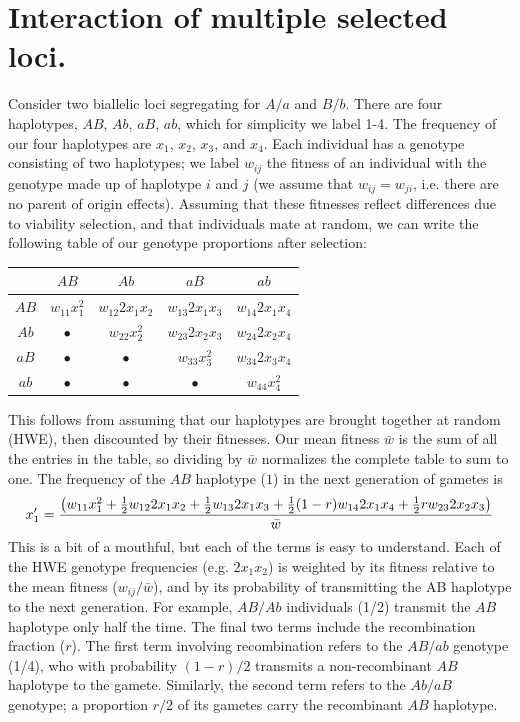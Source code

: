 \chapter{Interaction of multiple selected loci.}

Consider two biallelic loci segregating for $A/a$ and $B/b$. There are four haplotypes, $AB$, $Ab$, $aB$, $ab$, which for simplicity we label 1-4. The frequency of our four haplotypes are $x_1$, $x_2$, $x_3$, and $x_4$. Each individual has a genotype consisting of two haplotypes; we label $w_{ij}$ the fitness of an individual with the genotype made up of haplotype $i$ and $j$ (we assume that $w_{ij}=w_{ji}$, i.e. there are no parent of origin effects). Assuming that these fitnesses reflect differences due to viability selection, and that individuals mate at random, we can write the following table of our genotype proportions after selection:\\
\begin{center}
\begin{tabular}{c|cccc}
         & $AB$			& $Ab$				& $aB$				& $ab$\\
\hline
$AB$ & $w_{11} x_1^2$ 	& $w_{12} 2 x_1 x_2$  	& $w_{13} 2 x_1 x_3$ 	& $w_{14} 2 x_1 x_4$ \\
$Ab$ & $\bullet$ 	  	& $w_{22} x_2^2$ 	  	& $w_{23} 2 x_2 x_3$  	& $w_{24} 2 x_2 x_4$ \\  
$aB$ & $\bullet$ 		& $\bullet$ 			& $w_{33} x_3^2$ 	  	& $w_{34} 2 x_3 x_4$ \\  
$ab$ & $\bullet$ 		& $\bullet$			& $\bullet$ 			&  $w_{44} x_4^2$ \\
\end{tabular}
\end{center}
This follows from assuming that our haplotypes are brought together at random (HWE), then discounted by their fitnesses. Our mean fitness $\bar{w}$ is the sum of all the entries in the table, so dividing by $\bar{w}$ normalizes the complete table to sum to one. The frequency of the $AB$ haplotype ($1$) in the next generation of gametes is
\begin{equation}
x_1' = \frac{\big( w_{11} x_1^2 +	 \tfrac{1}{2} w_{12} 2 x_1 x_2  + \tfrac{1}{2} w_{13} 2x_1 x_3  +	 \tfrac{1}{2} (1-r) w_{14} 2 x_1 x_4 + \tfrac{1}{2} r w_{23} 2 x_2 x_3   \big)}{ \bar{w} } \label{eqn:hapfreq}
\end{equation}
This is a bit of a mouthful, but each of the terms is easy to understand. Each of the HWE genotype frequencies (e.g. $2x_1x_2$) is weighted by its fitness relative to the mean fitness ($w_{ij}/\bar{w}$), and by its probability of transmitting the AB haplotype to the next generation. For example, $AB/Ab$ individuals (1/2) transmit the $AB$ haplotype only half the time. The final two terms include the recombination fraction ($r$). The first term involving recombination refers to the $AB/ab$ genotype (1/4), who with probability $(1-r)/2$ transmits a non-recombinant $AB$ haplotype to the gamete. Similarly, the second term refers to the  $Ab/aB$ genotype; a proportion $r/2$ of its gametes carry the recombinant $AB$ haplotype. 

